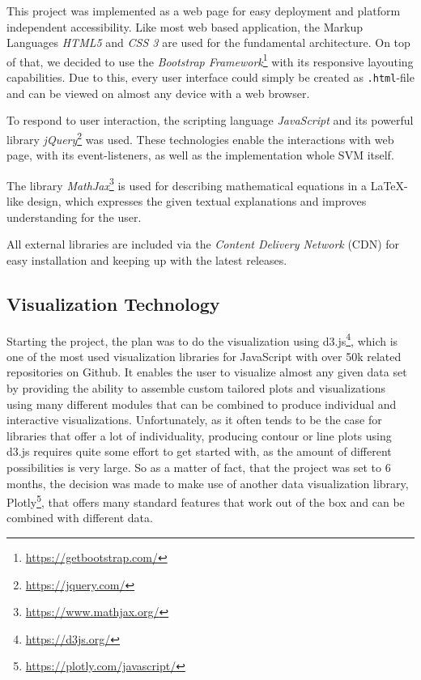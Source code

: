 \documentclass{scrartcl}
\begin{document}
This project was implemented as a web page for easy deployment and platform independent accessibility.
Like most web based application, the Markup Languages \textit{HTML5} and \textit{CSS 3} are used for the fundamental architecture.
On top of that, we decided to use the \textit{Bootstrap Framework}\footnote{\url{https://getbootstrap.com/}} with its responsive layouting capabilities.
Due to this, every user interface could simply be created as \verb|.html|-file and can be viewed on almost any device with a web browser.

To respond to user interaction, the scripting language \textit{JavaScript} and its powerful library \textit{jQuery}\footnote{\url{https://jquery.com/}} was used.
These technologies enable the interactions with web page, with its event-listeners, as well as the implementation whole SVM itself.

The library \textit{MathJax}\footnote{\url{https://www.mathjax.org/}} is used for describing mathematical equations in a \LaTeX-like design, which expresses the given textual explanations and improves understanding for the user.

All external libraries are included via the \textit{Content Delivery Network} (CDN) for easy installation and keeping up with the latest releases.

\subsection{Visualization Technology}

Starting the project, the plan was to do the visualization using d3.js\footnote{\url{https://d3js.org/}}, which is one of the most used visualization libraries for JavaScript with over 50k related repositories on Github.
It enables the user to visualize almost any given data set by providing the ability to assemble custom tailored plots and visualizations using many different modules that can be combined to produce individual and interactive visualizations.
Unfortunately, as it often tends to be the case for libraries that offer a lot of individuality, producing contour or line plots using d3.js requires quite some effort to get started with, as the amount of different possibilities is very large. 
So as a matter of fact, that the project was set to 6 months, the decision was made to make use of another data visualization library, Plotly\footnote{\url{https://plotly.com/javascript/}}, that offers many standard features that work out of the box and can be combined with different data.
\end{document}
